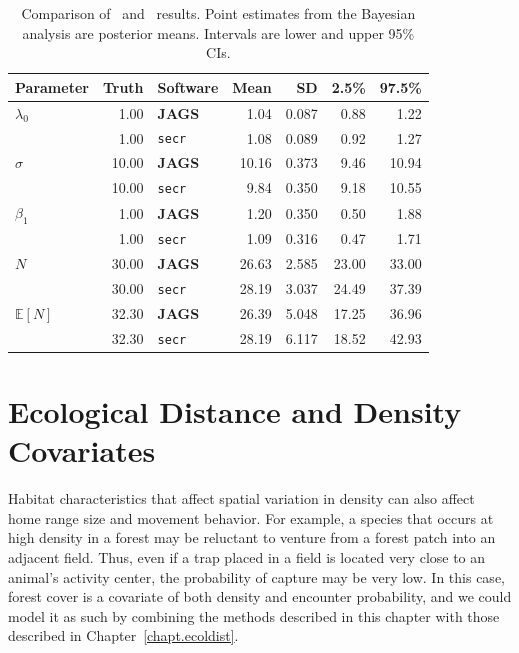 \begin{table}%
\centering
\caption{Comparison of \secr~and \jags~results. Point estimates from
  the Bayesian analysis are posterior means. Intervals are lower and
  upper 95\% CIs.}
\begin{tabular}{lrlrrrr}
\hline
Parameter 	& Truth 	& Software 	& Mean 	& SD 	& 2.5\% & 97.5\% \\
\hline
 $\lambda_0$ 	&  1.00 	& \textbf{JAGS} 	&  1.04 	& 0.087 	&  0.88 	&  1.22 \\
  	&  1.00 	& \texttt{secr} 	&  1.08 	& 0.089 	&  0.92 	&  1.27 \\
 $\sigma$ 	& 10.00 	& \textbf{JAGS} 	& 10.16 	& 0.373 	&  9.46 	& 10.94 \\
  	& 10.00 	& \texttt{secr} 	&  9.84 	& 0.350 	&  9.18 	& 10.55 \\
 $\beta_1$ 	&  1.00 	& \textbf{JAGS} 	&  1.20 	& 0.350 	&  0.50 	&  1.88 \\
  	&  1.00 	& \texttt{secr} 	&  1.09 	& 0.316 	&  0.47 	&  1.71 \\
 $N$ 	& 30.00 	& \textbf{JAGS} 	& 26.63 	& 2.585 	& 23.00 	& 33.00 \\
  	& 30.00 	& \texttt{secr} 	& 28.19 	& 3.037 	& 24.49 	& 37.39 \\
 $\mathbb{E}[N]$ 	& 32.30 	& \textbf{JAGS} 	& 26.39 	& 5.048 	& 17.25 	& 36.96 \\
  	& 32.30 	& \texttt{secr} 	& 28.19 	& 6.117 	& 18.52 	& 42.93 \\
\hline
\end{tabular}
\label{state-space.tab.jagsVsecr}
\end{table}


\section{Ecological Distance and Density Covariates}

Habitat characteristics that affect spatial variation in density can
also affect home range size and movement behavior. For example, a
species that occurs at high density in a forest may be reluctant to
venture from a forest patch into an adjacent field. Thus, even if a
trap placed in a field is located very close to an animal's activity
center, the probability of capture may be very
low. In this case, forest cover is a covariate of
both density and encounter probability,
and we could model it as such by combining the methods described in
this chapter with those described in Chapter~\ref{chapt.ecoldist}.

